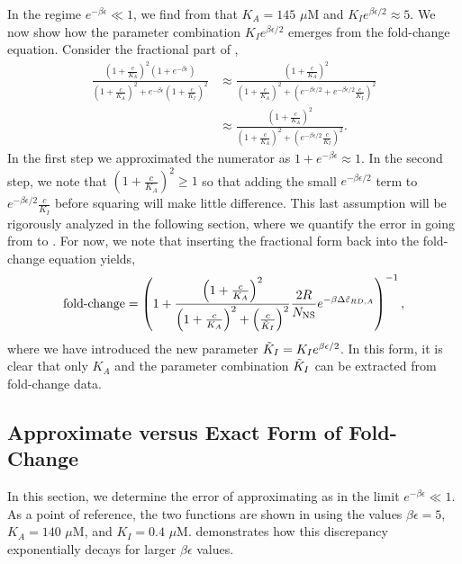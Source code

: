 In the regime $e^{- \beta \epsilon} \ll
1$, we find from \fref[SIfig5] that $K_A = 145\,\,\mu\text{M}$ and $K_I e^{\beta \epsilon/2} \approx 5$. We now show how the parameter combination $K_I e^{\beta \epsilon/2}$ emerges from the fold-change equation. Consider the fractional part of \eref[SIFullFoldChangeExpression],
\begin{align}
\frac{\left(1+\frac{c}{K_A}\right)^2 \left( 1 + e^{-\beta \epsilon} \right)}{\left(1+\frac{c}{K_A}\right)^2+e^{-\beta \epsilon}\left(1 + \frac{c}{K_I}\right)^2}
&\approx 
\frac{\left(1+\frac{c}{K_A}\right)^2}{\left(1+\frac{c}{K_A}\right)^2+\left(e^{-\beta \epsilon/2} + e^{-\beta \epsilon/2}\frac{c}{K_I}\right)^2} \label{eqSIstep2}\\
&\approx
\frac{\left(1+\frac{c}{K_A}\right)^2}{\left(1+\frac{c}{K_A}\right)^2+\left( e^{-\beta \epsilon/2}\frac{c}{K_I}\right)^2}.\label{eqSIstep3}
\end{align}
In the first step we approximated the numerator as $1 + e^{-\beta \epsilon}
\approx 1$. In the second step, we note that $\left(1+\frac{c}{K_A}\right)^2 \ge
1$ so that adding the small $e^{-\beta \epsilon/2}$ term to $e^{-\beta
	\epsilon/2}\frac{c}{K_I}$ before squaring will make little difference. This last
assumption will be rigorously analyzed in the following section, where we
quantify the error in going from \eref[eqSIstep2] to \eref[eqSIstep3]. For now,
we note that inserting the fractional form \eref[eqSIstep3] back into the
fold-change equation \eref[SIFullFoldChangeExpression] yields,
\begin{equation} \label{SIFullFoldChangeExpressionSloppiless}
\operatorname{fold-change} = \left(
1+\frac{\left(1+\frac{c}{K_A}\right)^2}{\left(1+\frac{c}{K_A}\right)^2+\left(\frac{c}{\tilde{K}_I}\right)^2}\frac{2 R}{N_{\text{NS}}}e^{-\beta \Delta\tilde{\varepsilon}_{RD,A}} \right)^{-1},
\end{equation}
where we have introduced the new parameter $\tilde{K}_I = K_I e^{\beta \epsilon/2}$. In this form, it is clear that only $K_A$ and the parameter combination $\tilde{K}_I$ can be extracted from fold-change data.


\subsection{Approximate versus Exact Form of Fold-Change}

In this section, we determine the error of approximating \eref[eqSIstep2] as
\eref[eqSIstep3] in the limit $e^{- \beta \epsilon} \ll 1$. As a point of
reference, the two functions are shown in \fref[SIfig6] using the
values $\beta \epsilon = 5$, $K_A = 140\,\,\mu\text{M}$, and $K_I =
0.4\,\,\mu\text{M}$. \fref[SIfig6] demonstrates how this discrepancy
exponentially decays for larger $\beta \epsilon$ values.


